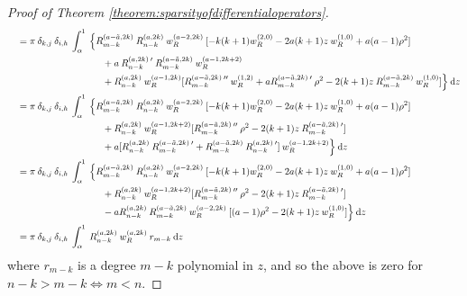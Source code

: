 \documentclass[11pt, oneside]{article}   	%
\begin{document}
\begin{proof}[Proof of Theorem \ref{theorem:sparsityofdifferentialoperators}]
\begin{align*}
	&\quad = \pi \: \delta_{k,j} \: \delta_{i,h} \: \int_\alpha^1 \: \Big\{ R_{m-k}^{(a - \tilde a, 2k)} \: R_{n-k}^{(a,2k)} \: w_R^{(a - 2, 2k)} \: [-k(k+1) w_R^{(2,0)} - 2a(k+1)z \: w_R^{(1,0)} + a (a-1) \rho^2] \\
	&\quad \quad \quad \quad \quad \quad \quad \quad \quad \quad + a \: R_{n-k}^{(a,2k) \: \prime} \: R_{m-k}^{(a - \tilde a, 2k)} \: w_R^{(a - 1, 2k+2)} \\
	&\quad \quad \quad \quad \quad \quad \quad \quad \quad \quad + R_{n-k}^{(a,2k)} \: w_R^{(a-1, 2k)} [R_{m-k}^{(a - \tilde a, 2k) \: \prime \prime} \: w_R^{(1, 2)} + a R_{m-k}^{(a - \tilde a, 2k) \: \prime} \: \rho^2 - 2(k+1) z \: R_{m-k}^{(a - \tilde a, 2k)} \: w_R^{(1, 0)}] \Big\} \: {\rm d} z \\
	&\quad = \pi \: \delta_{k,j} \: \delta_{i,h} \: \int_\alpha^1 \: \Big\{ R_{m-k}^{(a - \tilde a, 2k)} \: R_{n-k}^{(a,2k)} \: w_R^{(a - 2, 2k)} \: [-k(k+1) w_R^{(2,0)} - 2a(k+1)z \: w_R^{(1,0)} + a (a-1) \rho^2] \\
	&\quad \quad \quad \quad \quad \quad \quad \quad \quad \quad + R_{n-k}^{(a,2k)} \: w_R^{(a - 1, 2k+2)} [R_{m-k}^{(a - \tilde a, 2k) \: \prime \prime} \: \rho^2 - 2(k+1) z \: R_{m-k}^{(a - \tilde a, 2k) \: \prime} ] \\
	&\quad \quad \quad \quad \quad \quad \quad \quad \quad \quad + a [R_{n-k}^{(a,2k)} \: R_{m-k}^{(a - \tilde a, 2k) \: \prime} + R_{m-k}^{(a - \tilde a, 2k)} \: R_{n-k}^{(a, 2k) \: \prime}] \: w_R^{(a-1, 2k+2)} \Big\} \: {\rm d} z \\
	&\quad = \pi \: \delta_{k,j} \: \delta_{i,h} \: \int_\alpha^1 \: \Big\{ R_{m-k}^{(a - \tilde a, 2k)} \: R_{n-k}^{(a,2k)} \: w_R^{(a - 2, 2k)} \: [-k(k+1) w_R^{(2,0)} - 2a(k+1)z \: w_R^{(1,0)} + a (a-1) \rho^2] \\
	&\quad \quad \quad \quad \quad \quad \quad \quad \quad \quad + R_{n-k}^{(a,2k)} \: w_R^{(a - 1, 2k+2)} [R_{m-k}^{(a - \tilde a, 2k) \: \prime \prime} \: \rho^2 - 2(k+1) z \: R_{m-k}^{(a - \tilde a, 2k) \: \prime} ] \\
	&\quad \quad \quad \quad \quad \quad \quad \quad \quad \quad - a R_{n-k}^{(a,2k)} \: R_{m-k}^{(a - \tilde a, 2k)} \: w_R^{(a-2, 2k)} \: [(a-1) \rho^2 - 2(k+1) z \: w_R^{(1, 0)}] \Big\} \: {\rm d} z \\
	&\quad = \pi \: \delta_{k,j} \: \delta_{i,h} \: \int_\alpha^1 \: R_{n-k}^{(a,2k)} \: w_R^{(a, 2k)} \: r_{m-k} \: {\rm d} z
\end{align*}
where $r_{m-k}$ is a degree $m - k$ polynomial in $z$, and so the above is zero for $n - k > m - k \iff m < n$.


\end{proof}
\end{document}
